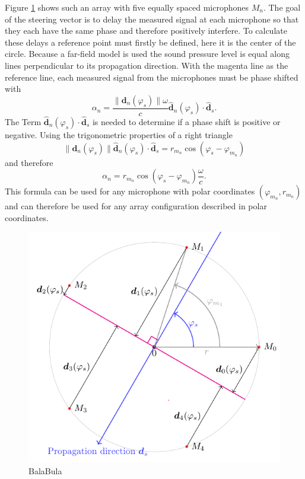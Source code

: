 Figure \ref*{ssl:fig:steering} shows such an array with five equally spaced microphones $M_n$.
The goal of the steering vector is to delay the measured signal at each microphone so that
they each have the same phase and therefore positively interfere.
To calculate these delays a reference point must firstly be defined, here it is the center of the circle.
Because a far-field model is used the sound pressure level is equal along lines perpendicular
to its propagation direction.
With the magenta line as the reference line, each measured signal from the microphones must be
phase shifted with 
\begin{equation}
  \alpha_n = 
  \frac{
    \lVert\bm{d}_n(\varphi_s)\rVert \omega}
    {c} 
    \hat{\bm{d}}_n(\varphi_s) \cdot \hat{\bm{d}}_s.
\end{equation}
The Term $\hat{\bm{d}}_n(\varphi_s) \cdot \hat{\bm{d}}_s$ is needed to determine
if a phase shift is positive or negative.
Using the trigonometric properties of a right triangle
\begin{equation}
  \lVert\bm{d}_n(\varphi_s)\rVert \hat{\bm{d}}_n(\varphi_s) \cdot \hat{\bm{d}}_s = r_{m_n} \cos(\varphi_s - \varphi_{m_n})
\end{equation}
and therefore
\begin{equation}
  \alpha_n = 
  r_{m_n} \cos(\varphi_s - \varphi_{m_n})
  \frac{\omega}{c}.
  \label{ssl:eq:beamr2}
\end{equation}
This formula can be used for any microphone with polar coordinates
$(\varphi_{m_n}, r_{m_n})$ and can therefore be used for any array configuration
described in polar coordinates.
\begin{figure}
  \centering
  \includegraphics[]{steering_vector.pdf}
  \caption{BalaBula}
  \label{ssl:fig:steering}
\end{figure}

